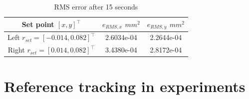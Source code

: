 \begin{table}[H]
    \centering
    \caption{RMS error after 15 seconds}
    \begin{tabular}{|c|c|c|} \hline
     Set point $[x,y]^\top$    & $e_{RMS,x}$ $mm^2$  &  $e_{RMS,y}$ $mm^2$  \\ \hline
    Left $r_{set}= [-0.014,0.082]^\top$     & 2.6034e-04  & 2.2644e-04 \\ \hline
    Right $r_{set}= [0.014,0.082]^\top$  & 3.4380e-04 &  2.8172e-04\\ \hline
    \end{tabular}

    \label{tab:my_label}
\end{table}






\section{Reference tracking in experiments}
















